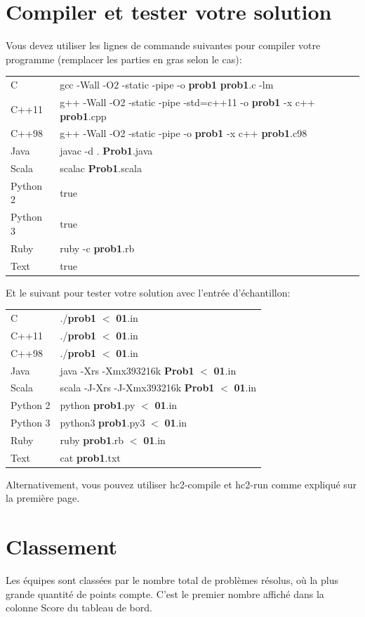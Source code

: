 \section{Compiler et tester votre solution}
Vous devez utiliser les lignes de commande suivantes pour compiler 
votre programme (remplacer les parties en gras selon le cas):
\begin{center}
\begin{tabular}{l|p{14cm}}
C&
gcc -Wall -O2 -static -pipe -o \textbf{prob1} \textbf{prob1}.c -lm \\
C++11&
g++ -Wall -O2 -static -pipe -std=c++11 -o \textbf{prob1} -x c++ \textbf{prob1}.cpp \\
C++98&
g++ -Wall -O2 -static -pipe -o \textbf{prob1} -x c++ \textbf{prob1}.c98 \\
Java&
javac -d . \textbf{Prob1}.java\\
Scala&
scalac \textbf{Prob1}.scala\\
Python 2&
true\\
Python 3&
true\\
Ruby&
ruby -c \textbf{prob1}.rb\\
Text&
true\\
\end{tabular}
\end{center}
Et le suivant pour tester votre solution avec l'entrée d'échantillon:
\begin{center}
\begin{tabular}{l|p{14cm}}
C&
./\textbf{prob1} $<$ \textbf{01}.in\\
C++11&
./\textbf{prob1} $<$ \textbf{01}.in\\
C++98&
./\textbf{prob1} $<$ \textbf{01}.in\\
Java&
java -Xrs -Xmx393216k \textbf{Prob1} $<$ \textbf{01}.in\\
Scala&
scala -J-Xrs -J-Xmx393216k \textbf{Prob1} $<$ \textbf{01}.in\\
Python 2&
python \textbf{prob1}.py $<$ \textbf{01}.in\\
Python 3&
python3 \textbf{prob1}.py3 $<$ \textbf{01}.in\\
Ruby&
ruby \textbf{prob1}.rb $<$ \textbf{01}.in\\
Text&
cat \textbf{prob1}.txt \\
\end{tabular}
\end{center}
Alternativement, vous pouvez utiliser hc2-compile et hc2-run comme expliqué sur la première page.

\section{Classement}
Les équipes sont classées par le nombre total de problèmes résolus, 
où la plus grande quantité de points compte. C'est le premier nombre 
affiché dans la colonne \og Score\fg{} du tableau de bord.

